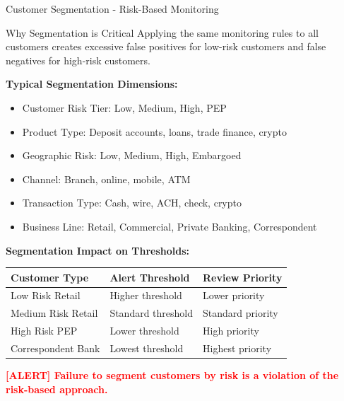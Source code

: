 \documentclass[11pt,a4paper]{beamer}
\newcommand{\redflag}[1]{\textcolor{red}{\textbf{[ALERT] #1}}}
\begin{document}
	\begin{frame}{Customer Segmentation - Risk-Based Monitoring}
		\begin{block}{Why Segmentation is Critical}
			Applying the same monitoring rules to all customers creates excessive false positives for low-risk customers and false negatives for high-risk customers.
		\end{block}
		
		\textbf{Typical Segmentation Dimensions:}
		\begin{itemize}
			\item Customer Risk Tier: Low, Medium, High, PEP
			\item Product Type: Deposit accounts, loans, trade finance, crypto
			\item Geographic Risk: Low, Medium, High, Embargoed
			\item Channel: Branch, online, mobile, ATM
			\item Transaction Type: Cash, wire, ACH, check, crypto
			\item Business Line: Retail, Commercial, Private Banking, Correspondent
		\end{itemize}
		
		\textbf{Segmentation Impact on Thresholds:}
		\begin{longtable}{p{}|p{}|p{}}
			\hline
			\rowcolor{lightgray}
			\textbf{Customer Type} & \textbf{Alert Threshold} & \textbf{Review Priority} \\
			\hline
			Low Risk Retail & Higher threshold & Lower priority \\
			\hline
			Medium Risk Retail & Standard threshold & Standard priority \\
			\hline
			High Risk PEP & Lower threshold & High priority \\
			\hline
			Correspondent Bank & Lowest threshold & Highest priority \\
			\hline
		\end{longtable}
		
		\redflag{Failure to segment customers by risk is a violation of the risk-based approach.}
	\end{frame}
	
\end{document}
